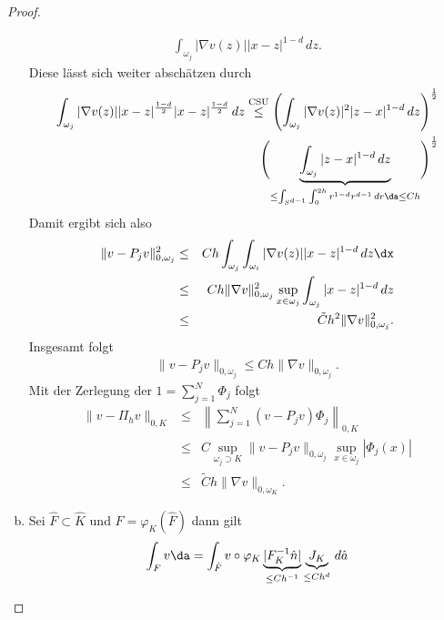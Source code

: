 \begin{proof}
\begin{enumerate}[a)]
\begin{eqnarray*}
                \int_{\omega_j} |\nabla v(z)| |x - z|^{1-d} \,dz.
        \end{eqnarray*}
        Diese lässt sich weiter abschätzen durch
        \begin{eqnarray*}
                \int_{\omega_j} |\nabla v(z)| |x - z|^{\frac{1-d}{2}}
                |x - z|^{\frac{1-d}{2}} \,dz
            \stackrel{\text{CSU}}{\le}
                \left(\int_{\omega_j} |\nabla v(z)|^2 |z - x|^{1-d} \,dz
                \right)^\frac{1}{2} \\
                \Biggl(\underbrace{\int_{\omega_j} |z - x|^{1-d}\,dz}
                _{\le \int_{S^{d-1}} \int_0^{2h} r^{1-d} r^{d-1} \,dr \da \le
                C h}\Biggr)^\frac{1}{2}
        \end{eqnarray*}
        Damit ergibt sich also
        \begin{eqnarray*}
                  \|v - P_jv\|_{0,\omega_j}^2
            &\le& Ch \int_{\omega_j} \int_{\omega_i} |\nabla v(z)| |x - z|^{1-d}
                  \,dz \dx \\
            &\le& Ch \|\nabla v\|_{0,\omega_j}^2 \sup_{x\in\omega_j}
                  \int_{\omega_j} |x - z|^{1-d} \,dz \\
            &\le& \tilde C h^2 \|\nabla v\|_{0,\omega_j}^2.
        \end{eqnarray*}
        Insgesamt folgt
        \begin{eqnarray*}
                \|v - P_jv\|_{0,\omega_j}
            \le Ch \|\nabla v\|_{0,\omega_j}.
        \end{eqnarray*}
        Mit der Zerlegung der $1 = \sum_{j=1}^N \Phi_j$ folgt
        \begin{eqnarray*}
                  \|v - \Pi_hv\|_{0,K}
            &\le& \left\|\sum_{j=1}^N (v - P_jv) \Phi_j\right\|_{0,K} \\
            &\le& C \sup_{\omega_j \supset K} \|v - P_jv\|_{0,\omega_j}
                  \sup_{x\in\omega_j} |\Phi_j(x)| \\
            &\le& \tilde C h \|\nabla v\|_{0,\omega_K}.
        \end{eqnarray*}
      \item
        Sei $\hat F \subset \hat K$ und $F = \varphi_K(\hat F)$ dann gilt
        \begin{eqnarray*}
              \int_F v \da
            = \int_{\hat F} v \circ \varphi_K \underbrace{|F_K^{-1} \hat n|}
              _{\le C h^{-1}} \underbrace{J_K}_{\le C h^d} \,d\hat a
        \end{eqnarray*}

\end{enumerate}
\end{proof}
